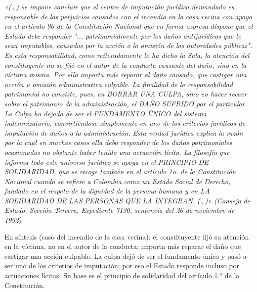 \begin{cita}
\textit{«(…) se impone concluir que el centro de imputación jurídica demandado es responsable de los perjuicios causados con el incendio en la casa vecina con apoyo en el artículo 90 de la Constitución Nacional que en forma expresa dispone que el Estado debe responder "... patrimonialmente por los daños antijurídicos que le sean imputables, causados por la acción o la omisión de las autoridades públicas". Es esta responsabilidad, como reiteradamente lo ha dicho la Sala, la atención del constituyente no se fijó en el autor de la conducta causante del daño, sino en la víctima misma. Por ello importa más reparar el daño causado, que castigar una acción u omisión administrativa culpable. La finalidad de la responsabilidad patrimonial no consiste, pues, en BORRAR UNA CULPA, sino en hacer recaer sobre el patrimonio de la administración, el DAÑO SUFRIDO por el particular. La Culpa ha dejado de ser el FUNDAMENTO ÚNICO del sistema indemnizatorio, convirtiéndose simplemente en uno de los criterios jurídicos de imputación de daños a la administración. Esta verdad jurídica explica la razón por la cual en muchos casos ella deba responder de los daños patrimoniales ocasionados no obstante haber tenido una actuación lícita. La filosofía que informa todo este universo jurídico se apoya en el PRINCIPIO DE SOLIDARIDAD, que se recoge también en el artículo 1o. de la Constitución Nacional cuando se refiere a Colombia como un Estado Social de Derecho, fundado en el respeto de la dignidad de la persona humana y en LA SOLIDARIDAD DE LAS PERSONAS QUE LA INTEGRAN. (…)» (Consejo de Estado, Sección Tercera, Expediente 7130, sentencia del 26 de noviembre de 1992)}
\end{cita}
En síntesis (caso del incendio de la casa vecina): el constituyente fijó su atención en la víctima, no en el autor de la conducta; importa más reparar el daño que castigar una acción culpable. La culpa dejó de ser el fundamento único y pasó a ser uno de los criterios de imputación; por eso el Estado responde incluso por actuaciones lícitas. Su base es el principio de solidaridad del artículo 1.º de la Constitución.

